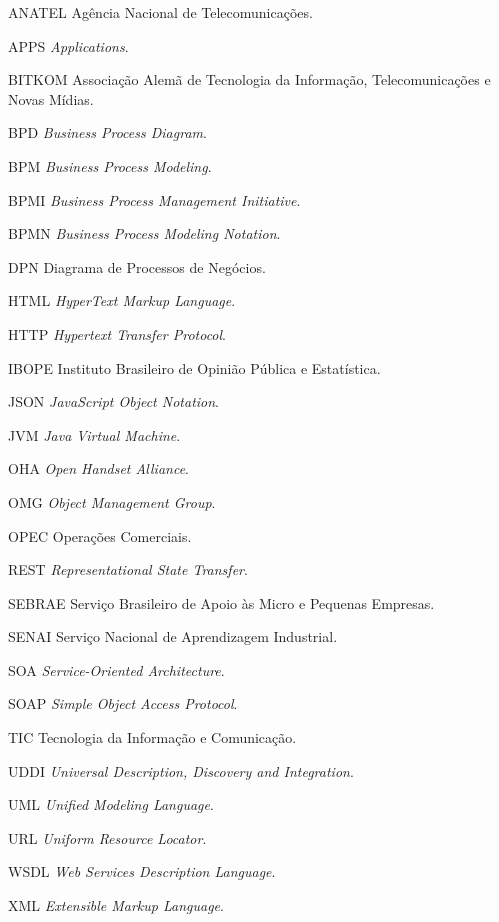 
\begin{siglas}
  \item[ANATEL] Agência Nacional de Telecomunicações.
  \item[APPS] \textit{Applications}.
  \item[BITKOM] Associação Alemã de Tecnologia da Informação, Telecomunicações e Novas Mídias.
  \item[BPD] \textit{Business Process Diagram}.
  \item[BPM] \textit{Business Process Modeling}.
  \item[BPMI] \textit{Business Process Management Initiative}.
  \item[BPMN] \textit{Business Process Modeling Notation}.
  \item[DPN] Diagrama de Processos de Negócios.
  \item[HTML] \textit{HyperText Markup Language}.
  \item[HTTP] \textit{Hypertext Transfer Protocol}.
  \item[IBOPE] Instituto Brasileiro de Opinião Pública e Estatística.
  \item[JSON] \textit{JavaScript Object Notation}.
  \item[JVM] \textit{Java Virtual Machine}.
  \item[OHA] \textit{Open Handset Alliance}.
  \item[OMG] \textit{Object Management Group}.
  \item[OPEC] Operações Comerciais.
  \item[REST] \textit{Representational State Transfer}.
  \item[SEBRAE] Serviço Brasileiro de Apoio às Micro e Pequenas Empresas.
  \item[SENAI] Serviço Nacional de Aprendizagem Industrial.
  \item[SOA] \textit{Service-Oriented Architecture}.
  \item[SOAP] \textit{Simple Object Access Protocol}.
  \item[TIC] Tecnologia da Informação e Comunicação.
    \item[UDDI] \textit{Universal Description, Discovery and Integration}.
  \item[UML] \textit{Unified Modeling Language}.  
  \item[URL] \textit{Uniform Resource Locator}.
  \item[WSDL] \textit{Web Services Description Language}.
  \item[XML] \textit{Extensible Markup Language}.
  
   
\end{siglas}

